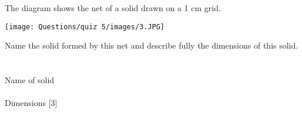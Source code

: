 \newpage
\question
The diagram shows the net of a solid drawn on a 1 cm grid.
\begin{center}
        \texttt{[image: Questions/quiz 5/images/3.JPG]}
\end{center}
Name the solid formed by this net and describe fully the dimensions of this solid.\\ 
\\
\\
Name of solid \makebox[17em]{\dotfill}\\ 
\\
Dimensions  \makebox[34em]{\dotfill} [3]